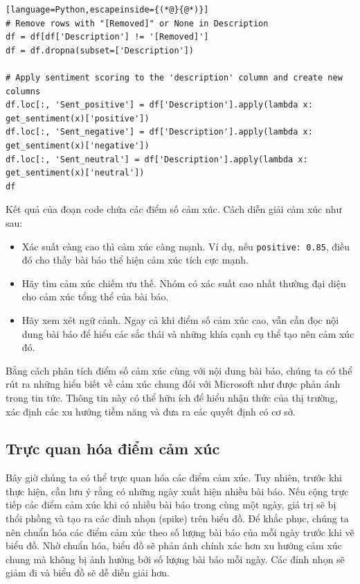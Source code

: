 \begin{lstlisting}[language=Python,escapeinside={(*@}{@*)}]
# Remove rows with "[Removed]" or None in Description
df = df[df['Description'] != '[Removed]']
df = df.dropna(subset=['Description'])

# Apply sentiment scoring to the 'description' column and create new columns
df.loc[:, 'Sent_positive'] = df['Description'].apply(lambda x: get_sentiment(x)['positive'])
df.loc[:, 'Sent_negative'] = df['Description'].apply(lambda x: get_sentiment(x)['negative'])
df.loc[:, 'Sent_neutral'] = df['Description'].apply(lambda x: get_sentiment(x)['neutral'])
df
\end{lstlisting}

Kết quả của đoạn code chứa các điểm số cảm xúc. Cách diễn giải cảm xúc như sau:

\begin{itemize}
\item
  Xác suất càng cao thì cảm xúc càng mạnh. Ví dụ, nếu \texttt{positive:\ 0.85}, điều đó cho thấy bài báo thể hiện cảm xúc tích cực mạnh.
\item
  Hãy tìm cảm xúc chiếm ưu thế. Nhóm có xác suất cao nhất thường đại diện cho cảm xúc tổng thể của bài báo.
\item
  Hãy xem xét ngữ cảnh. Ngay cả khi điểm số cảm xúc cao, vẫn cần đọc nội dung bài báo để hiểu các sắc thái và những khía cạnh cụ thể tạo nên cảm xúc đó.
\end{itemize}

Bằng cách phân tích điểm số cảm xúc cùng với nội dung bài báo, chúng ta có thể rút ra những hiểu biết về cảm xúc chung đối với Microsoft như được phản ánh trong tin tức. Thông tin này có thể hữu ích để hiểu nhận thức của thị trường, xác định các xu hướng tiềm năng và đưa ra các quyết định có cơ sở.

\subsection{Trực quan hóa điểm cảm xúc}

Bây giờ chúng ta có thể trực quan hóa các điểm cảm xúc. Tuy nhiên, trước khi thực hiện, cần lưu ý rằng có những ngày xuất hiện nhiều bài báo. Nếu cộng trực tiếp các điểm cảm xúc khi có nhiều bài báo trong cùng một ngày, giá trị sẽ bị thổi phồng và tạo ra các đỉnh nhọn (spike) trên biểu đồ. Để khắc phục, chúng ta nên chuẩn hóa các điểm cảm xúc theo số lượng bài báo của mỗi ngày trước khi vẽ biểu đồ. Nhờ chuẩn hóa, biểu đồ sẽ phản ánh chính xác hơn xu hướng cảm xúc chung mà không bị ảnh hưởng bởi số lượng bài báo mỗi ngày. Các đỉnh nhọn sẽ giảm đi và biểu đồ sẽ dễ diễn giải hơn.

